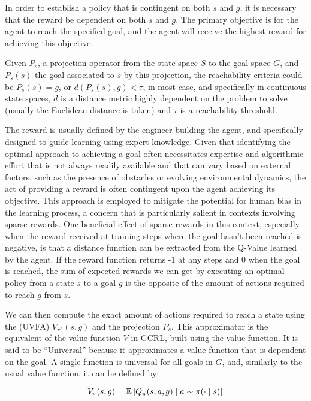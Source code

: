 In order to establish a policy that is contingent on both $s$ and $g$, it is necessary that the reward be dependent on both $s$ and $g$.
The primary objective is for the agent to reach the specified goal, and the agent will receive the highest reward for achieving this objective.

Given $P_s$, a projection operator from the state space $S$ to the goal space $G$, and $P_s(s)$ the goal associated to
$s$ by this projection, the reachability criteria could be $P_s(s) = g$, or $d(P_s(s), g) < \tau$, in most case, and
specifically in continuous state spaces,  $d$  is a distance metric highly dependent on the problem to solve (usually
the Euclidean distance is taken) and $\tau$ is a reachability threshold.

The reward is usually defined by the engineer building the agent, and specifically designed to guide learning using
expert knowledge.
Given that identifying the optimal approach to achieving a goal often necessitates expertise and algorithmic effort
that is not always readily available and that can vary based on external factors,
such as the presence of obstacles or evolving environmental dynamics,
the act of providing a reward is often contingent upon the agent achieving its objective.
This approach is employed to mitigate the potential for human bias in the learning process,
a concern that is particularly salient in contexts involving sparse rewards.
One beneficial effect of sparse rewards in this context, especially when the reward received at training steps
where the goal hasn't been reached is negative, is that a distance function can be extracted from the Q-Value learned by
the agent.
If the reward function returns -1 at any steps and 0 when the goal is reached, the sum of expected rewards we can get by
executing an optimal policy from a state $s$ to a goal $g$ is the opposite of the amount of actions required to
reach $g$ from $s$.

We can then compute the exact amount of actions required to reach a state using the  (UVFA)
$V_{\pi^*}(s, g)$ and the projection $P_s$.
This approximator is the equivalent of the value function $V$ in GCRL, built using the value function.
It is said to be ``Universal'' because it approximates a value function that is dependent on the goal.
A single function is universal for all goals in $G$, and, similarly to the usual value function, it can
be defined by:

\begin{equation} \label{eq:bg:rl:uvfa}
    V_\pi(s, g) = \mathbb{E} \left[ Q_\pi(s, a, g) \mid a \sim \pi(\cdot \mid s) \right] \\
\end{equation}

